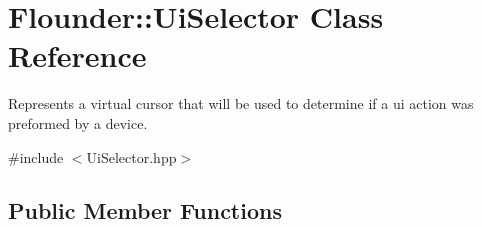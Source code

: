 \hypertarget{class_flounder_1_1_ui_selector}{}\section{Flounder\+:\+:Ui\+Selector Class Reference}
\label{class_flounder_1_1_ui_selector}


Represents a virtual cursor that will be used to determine if a ui action was preformed by a device.  




{\ttfamily \#include $<$Ui\+Selector.\+hpp$>$}

\subsection*{Public Member Functions}

